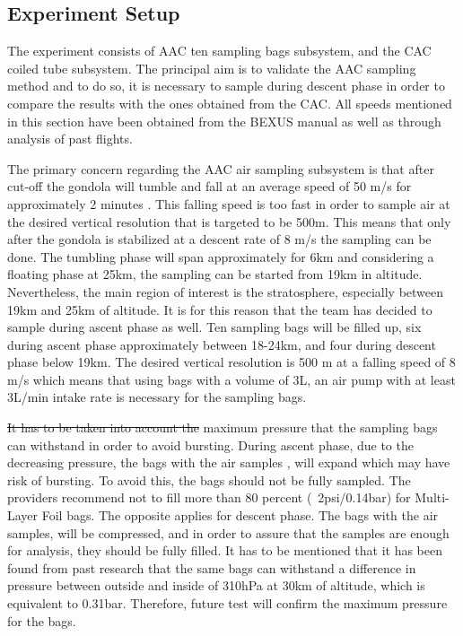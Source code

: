 \documentclass[a4paper,12pt,twoside]{article}
\providecommand{\DIFaddtex}[1]{{\protect\color{blue}\uwave{#1}}} %
\providecommand{\DIFdeltex}[1]{{\protect\color{red}\sout{#1}}}                      %
\providecommand{\DIFaddbegin}{} %
\providecommand{\DIFaddend}{} %
\providecommand{\DIFdelbegin}{} %
\providecommand{\DIFdelend}{} %
\providecommand{\DIFadd}[1]{\texorpdfstring{\DIFaddtex{#1}}{#1}} %
\providecommand{\DIFdel}[1]{\texorpdfstring{\DIFdeltex{#1}}{}} %
\newcommand{\DIFscaledelfig}{0.5}
\newlength{\DIFdelgraphicswidth} %
\newlength{\DIFdelgraphicsheight} %
\newcommand{\DIFaddincludegraphics}[2][]{{\color{blue}\fbox{\DIFOincludegraphics[#1]{#2}}}} %
\newcommand{\DIFdelincludegraphics}[2][]{%
\sbox{\DIFdelgraphicsbox}{\DIFOincludegraphics[#1]{#2}}%
\settoboxwidth{\DIFdelgraphicswidth}{\DIFdelgraphicsbox} %
\settoboxtotalheight{\DIFdelgraphicsheight}{\DIFdelgraphicsbox} %
\scalebox{\DIFscaledelfig}{%
\parbox[b]{\DIFdelgraphicswidth}{\usebox{\DIFdelgraphicsbox}\\[-\baselineskip] \rule{\DIFdelgraphicswidth}{0em}}\llap{\resizebox{\DIFdelgraphicswidth}{\DIFdelgraphicsheight}{%
\setlength{\unitlength}{\DIFdelgraphicswidth}%
\begin{picture}(1,1)%
\thicklines\linethickness{2pt} %
{\color[rgb]{1,0,0}\put(0,0){\framebox(1,1){}}}%
{\color[rgb]{1,0,0}\put(0,0){\line( 1,1){1}}}%
{\color[rgb]{1,0,0}\put(0,1){\line(1,-1){1}}}%
\end{picture}%
}\hspace*{3pt}}} %
} %
\DeclareRobustCommand{\DIFaddbegin}{\DIFOaddbegin \let\includegraphics\DIFaddincludegraphics} %
\DeclareRobustCommand{\DIFaddend}{\DIFOaddend \let\includegraphics\DIFOincludegraphics} %
\DeclareRobustCommand{\DIFdelbegin}{\DIFOdelbegin \let\includegraphics\DIFdelincludegraphics} %
\DeclareRobustCommand{\DIFdelend}{\DIFOaddend \let\includegraphics\DIFOincludegraphics} %
\begin{document}
\subsection{Experiment Setup} \label{Experiment_Setup}

The experiment consists of AAC ten sampling bags subsystem, and the CAC coiled tube subsystem. The principal aim is to validate the AAC sampling method and to do so, it is necessary to sample during descent phase in order to compare the results with the ones obtained from the CAC. All speeds mentioned in this section have been obtained from the BEXUS manual as well as through analysis of past flights.

The primary concern regarding the AAC air sampling subsystem is that after cut-off the gondola will tumble and fall at an average speed of 50 m/s for approximately 2 minutes \cite{BexusManual}. This falling speed is too fast in order to sample air at the desired vertical resolution that is targeted to be 500m. This means that only after the gondola is stabilized at a descent rate of 8 m/s \cite{BexusManual} the sampling can be done. The tumbling phase will span approximately for 6km and considering a floating phase at 25km, the sampling can be started from 19km in altitude. Nevertheless, the main region of interest is the stratosphere, especially between 19km and 25km of altitude. It is for this reason that the team has decided to sample during ascent phase as well. Ten sampling bags will be filled up, six during ascent phase approximately between 18-24km, and four during descent phase below 19km. The desired vertical resolution is 500 m at a falling speed of 8 m/s which means that using bags with a volume of 3L, an air pump with at least 3L/min intake rate is necessary for the sampling bags.

\DIFdelbegin \DIFdel{It has to be taken into account the }\DIFdelend \DIFaddbegin \DIFadd{The }\DIFaddend maximum pressure that the sampling bags can withstand \DIFaddbegin \DIFadd{has to be taken into account }\DIFaddend in order to avoid bursting. During ascent phase, due to the decreasing pressure, the bags with the air samples , will expand which may have risk of bursting. To avoid this, the bags should not be fully sampled. The providers recommend not to fill more than 80 percent (~2psi/0.14bar) for Multi-Layer Foil bags. The opposite applies for descent phase. The bags with the air samples, will be compressed, and in order to assure that the samples are enough for analysis, they should be fully filled. It has to be mentioned that it has been found from past research \DIFaddbegin \DIFadd{\mbox{%
\cite{LISA} }\hspace{0pt}%
}\DIFaddend that the same bags can withstand a difference in pressure between outside and inside of 310hPa at 30km of altitude, which is equivalent to 0.31bar. Therefore, future test will confirm the maximum pressure for the bags.
\end{document}
